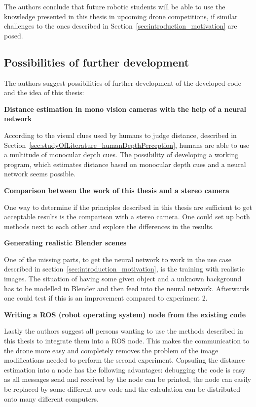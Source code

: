 The authors conclude that future robotic students will be able to use the knowledge presented in this thesis in upcoming drone competitions, if similar challenges to the ones described in Section~\ref{sec:introduction_motivation} are posed.

\subsection{Possibilities of further development}

The authors suggest possibilities of further development of the developed code and the idea of this thesis:

\textbf{Distance estimation in mono vision cameras with the help of a neural network}

According to the visual clues used by humans to judge distance, described in Section~\ref{sec:studyOfLiterature_humanDepthPerception}, humans are able to use a multitude of monocular depth cues. The possibility of developing a working program, which estimates distance based on monocular depth cues and a neural network seems possible.

\textbf{Comparison between the work of this thesis and a stereo camera}

One way to determine if the principles described in this thesis are sufficient to get acceptable results is the comparison with a stereo camera. One could set up both methods next to each other and explore the differences in the results.

\textbf{Generating realistic Blender scenes}

One of the missing parts, to get the neural network to work in the use case described in section~\ref{sec:introduction_motivation}, is the training with realistic images. The situation of having some given object and a unknown background has to be modelled in Blender and then feed into the neural network. Afterwards one could test if this is an improvement compared to experiment 2.

\textbf{Writing a ROS (robot operating system) node from the existing code}

Lastly the authors suggest all persons wanting to use the methods described in this thesis to integrate them into a ROS node. This makes the communication to the drone more easy and completely removes the problem of the image modifications needed to perform the second experiment. Capsuling the distance estimation into a node has the following advantages: debugging the code is easy as all messages send and received by the node can be printed, the node can easily be replaced by some different new code and the calculation can be distributed onto many different computers.

